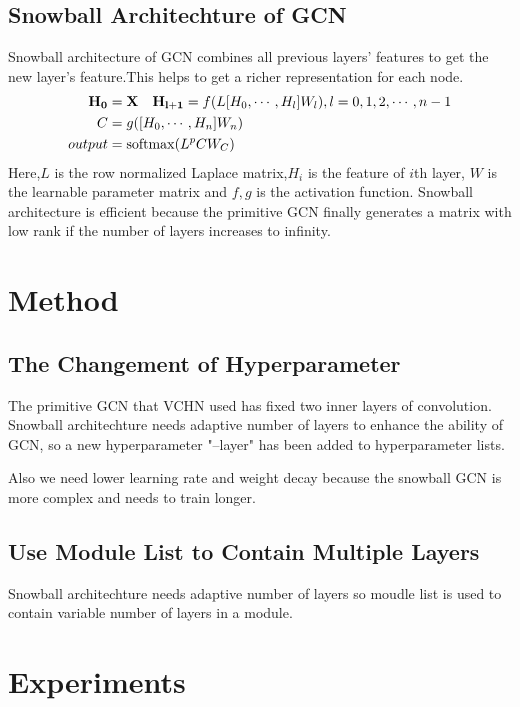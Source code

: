 \documentclass{article}
\begin{document}
\subsection{Snowball Architechture of GCN}
Snowball architecture of GCN \cite{snowball} combines all previous layers' features to get the new layer's
feature.This helps to get a richer representation for each node.
\begin{equation}
    \begin{aligned}
    \mathbf{H_0} &= \mathbf{X} \quad
    \mathbf{H_{l+1}}=f(L[H_0,\cdots,H_l]W_l),l=0,1,2,\cdots,n-1\\
    C &=g([H_0,\cdots,H_n]W_n)\\
    output &={\rm softmax} (L^p C W_C)
    \end{aligned}
\end{equation}
Here,$L$ is the row normalized Laplace matrix,$H_i$ is the feature of $i$th layer,
$W$ is the learnable parameter matrix and $f,g$ is the activation function.
Snowball architecture is efficient because the primitive GCN finally generates
a matrix with low rank if the number of layers increases to infinity.
\section{Method}
\subsection{The Changement of Hyperparameter}
The primitive GCN that VCHN used has fixed two inner layers of convolution.
Snowball architechture needs adaptive number of layers to enhance the ability of GCN,
so a new hyperparameter "--layer" has been added to hyperparameter lists.

Also we need lower learning rate and weight decay because the snowball GCN is more complex and
needs to train longer.
\subsection{Use Module List to Contain Multiple Layers}
Snowball architechture needs adaptive number of layers so moudle list is used to contain 
variable number of layers in a module.


\section{Experiments}
\end{document}
